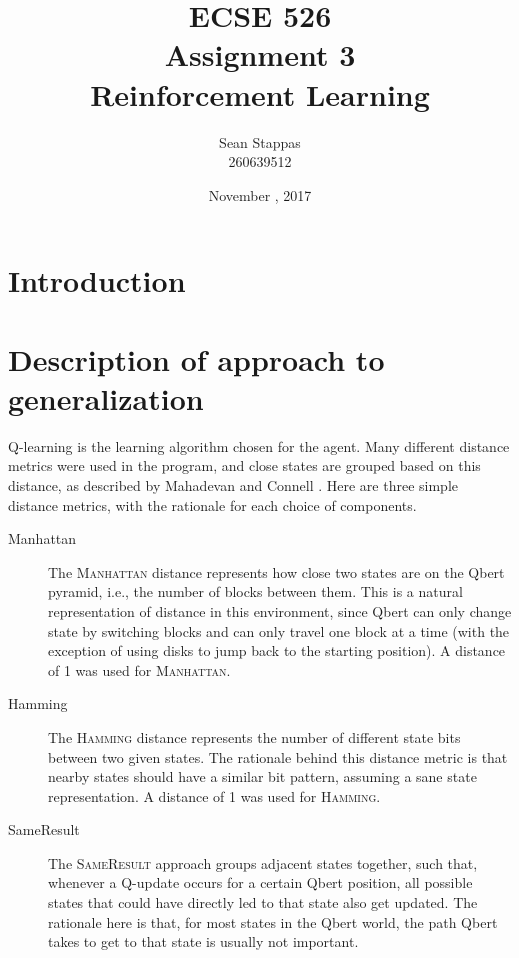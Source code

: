 \documentclass[a4paper,titlepage]{article}
\title{
	\textbf{ECSE 526 \\ Assignment 3}
	\\ \large Reinforcement Learning
}
\author{Sean Stappas \\ 260639512}
\date{November \nth{7}, 2017}
\begin{document}
	\sloppy
	\maketitle
	\twocolumn
	
	\section*{Introduction}
	
	
	\section{Description of approach to generalization} \label{sec:generalization_description}
	
	Q-learning is the learning algorithm chosen for the agent. Many different distance metrics were used in the program, and close states are grouped based on this distance, as described by Mahadevan and Connell \cite{mahadevan}. Here are three simple distance metrics, with the rationale for each choice of components.
	
	\begin{description}
		\item[Manhattan] The \textsc{Manhattan} distance represents how close two states are on the Qbert pyramid, i.e., the number of blocks between them. This is a natural representation of distance in this environment, since Qbert can only change state by switching blocks and can only travel one block at a time (with the exception of using disks to jump back to the starting position). A distance of 1 was used for \textsc{Manhattan}.
		
		\item[Hamming] The \textsc{Hamming} distance represents the number of different state bits between two given states. The rationale behind this distance metric is that nearby states should have a similar bit pattern, assuming a sane state representation. A distance of 1 was used for \textsc{Hamming}.
		
		\item[SameResult] The \textsc{SameResult} approach groups adjacent states together, such that, whenever a Q-update occurs for a certain Qbert position, all possible states that could have directly led to that state also get updated. The rationale here is that, for most states in the Qbert world, the path Qbert takes to get to that state is usually not important.
	\end{description}
	
\end{document}
